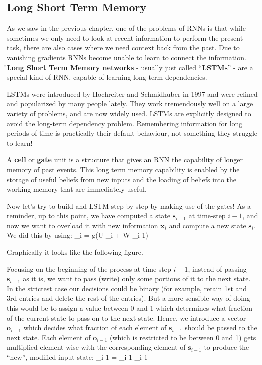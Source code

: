 \subsection{Long Short Term Memory}

As we saw in the previous chapter, one of the problems of RNNs is that while sometimes we only need to look at recent
information to perform the present task, there are also cases where we need context back from the past. Due to
vanishing gradients RNNs become unable to learn to connect the information. \v

\textbf{Long Short Term Memory networks} - usually just called ``\textbf{LSTMs}'' - are a special kind of RNN,
capable of learning long-term dependencies.
\ed

LSTMs were introduced by Hochreiter and Schmidhuber in 1997 and were refined and popularized by many people lately.
They work tremendously well on a large variety of problems, and are now widely used. LSTMs are explicitly designed to
avoid the long-term dependency problem. Remembering information for long periods of time is practically their default
behaviour, not something they struggle to learn!

A \textbf{cell} or \textbf{gate} unit is a structure that gives an RNN the capability of longer memory of past events.
This long term memory capability is enabled by the storage of useful beliefs from new inputs and the loading of
beliefs into the working memory that are immediately useful.
\ed

Now let's try to build and LSTM step by step by making use of the gates! As a reminder, up to this point, we have
computed a state $\boldsymbol{s}_{i-1}$ at time-step $i - 1$, and now we want to overload it with new information
$\boldsymbol{x}_{i}$ and compute a new state $\boldsymbol{s}_{i}$. We did this by using:
\bse
{}_{i} = g(U _{i} + W _{i-1})
\ese

Graphically it looks like the following figure.


Focusing on the beginning of the process at time-step $i-1$, instead of passing $\boldsymbol{s}_{i-1}$ as it is, we
want to pass (write) only some portions of it to the next state. In the strictest case our decisions could be binary
(for example, retain 1st and 3rd entries and delete the rest of the entries). But a more sensible way of doing this
would be to assign a value between 0 and 1 which determines what fraction of the current state to pass on to the next
state. Hence, we introduce a vector $\boldsymbol{o}_{i-1}$ which decides what fraction of each element of
$\boldsymbol{s}_{i-1}$ should be passed to the next state. Each element of $\boldsymbol{o}_{i-1}$ (which is
restricted to be between 0 and 1) gets multiplied element-wise with the corresponding element of
$\boldsymbol{s}_{i-1}$ to produce the ``new'', modified input state:
\bse
{}_{i-1} = _{i-1} \odot {}_{i-1}
\ese

